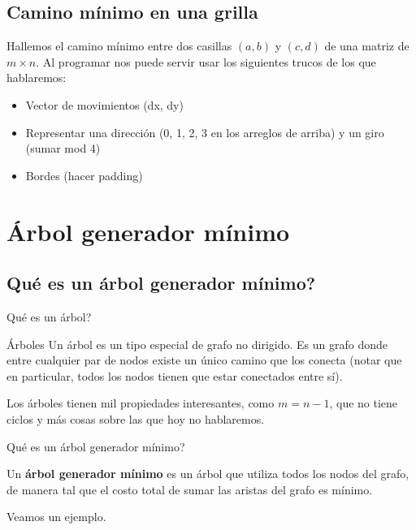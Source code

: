 \documentclass[compress]{beamer}
\begin{document}
\subsection{Camino mínimo en una grilla}
Hallemos el camino mínimo entre dos casillas $(a,b)$ y $(c,d)$ de una matriz de $m \times n$.
Al programar nos puede servir usar los siguientes trucos de los que hablaremos:

\begin{frame}
\begin{itemize}
\item Vector de movimientos (dx, dy)
\item Representar una dirección (0, 1, 2, 3 en los arreglos de arriba) y un giro (sumar mod 4)
\item Bordes (hacer padding)
\end{itemize}
\end{frame}

\section{Árbol generador mínimo}

\subsection{\textquestiondown Qué es un árbol generador mínimo?}

\begin{frame}{\textquestiondown Qué es un árbol?}
\begin{block}{Árboles}
Un árbol es un tipo especial de grafo no dirigido. Es un grafo donde 
entre cualquier par de nodos existe un único camino que los conecta 
(notar que en particular, todos los nodos tienen que estar conectados entre sí).
\end{block}

Los árboles tienen mil propiedades interesantes, como $m = n -1$, 
que no tiene ciclos y más cosas sobre las que hoy no hablaremos.
\end{frame}

\begin{frame}{\textquestiondown Qué es un árbol generador mínimo?}

Un \textbf{árbol generador mínimo} es un árbol que utiliza todos los nodos
del grafo, de manera tal que el costo total de sumar las aristas del grafo
es mínimo.

\bigskip

Veamos un ejemplo.
\end{frame}
\end{document}
